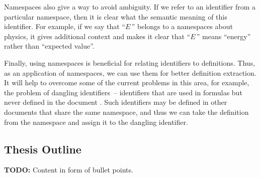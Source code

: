 Namespaces also give a way to avoid ambiguity. If we refer to an identifier from a 
particular namespace, then it is clear what the semantic meaning of this 
identifier. For example, if we say that ``$E$\,'' belongs to a namespaces 
about physics, it gives additional context and makes it clear that ``$E$\,''
means ``energy'' rather than ``expected value''.

Finally, using namespaces is beneficial for relating identifiers to 
definitions. Thus, as an application of namespaces, we can use them for better 
definition extraction. It will help to overcome some of the current problems in 
this area, for example, the problem of dangling identifiers~-- identifiers that are 
used in  formulas but never defined in the document \cite{pagael2014mlp}. 
Such identifiers may be defined in other documents that share the same namespace, 
and thus we can take the definition from the namespace and assign it to the dangling identifier.




\subsection{Thesis Outline}


\textbf{TODO:} Content in form of bullet points.

